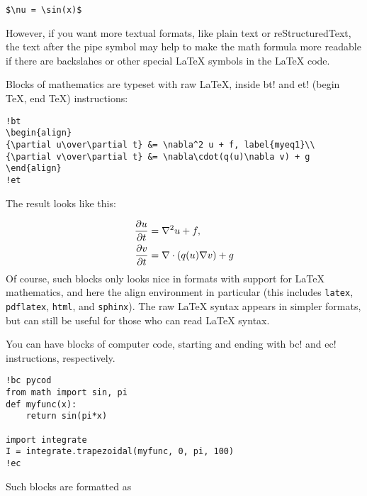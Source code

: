 \documentclass[%
oneside,                 %
final,                   %
10pt]{article}
\begin{document}
\begin{Verbatim}[fontsize=\fontsize{9pt}{9pt},tabsize=8,baselinestretch=0.85,fontfamily=tt,xleftmargin=7mm]
$\nu = \sin(x)$
\end{Verbatim}
\noindent
However, if you want more textual formats, like plain text or reStructuredText,
the text after the pipe symbol may help to make the math formula more readable
if there are backslahes or other special {\LaTeX} symbols in the {\LaTeX} code.

Blocks of mathematics are typeset with raw {\LaTeX}, inside
{\fontsize{10pt}{10pt}\Verb!!bt!} and {\fontsize{10pt}{10pt}\Verb!!et!} (begin TeX, end TeX) instructions:

\begin{Verbatim}[fontsize=\fontsize{9pt}{9pt},tabsize=8,baselinestretch=0.85,fontfamily=tt,xleftmargin=7mm]
!bt
\begin{align}
{\partial u\over\partial t} &= \nabla^2 u + f, label{myeq1}\\ 
{\partial v\over\partial t} &= \nabla\cdot(q(u)\nabla v) + g
\end{align}
!et
\end{Verbatim}
\noindent
The result looks like this:

\begin{align}
{\partial u\over\partial t} &= \nabla^2 u + f, \label{myeq1}\\ 
{\partial v\over\partial t} &= \nabla\cdot(q(u)\nabla v) + g
\end{align}
Of course, such blocks only looks nice in formats with support
for {\LaTeX} mathematics, and here the align environment in particular
(this includes {\fontsize{10pt}{10pt}\Verb!latex!}, {\fontsize{10pt}{10pt}\Verb!pdflatex!}, {\fontsize{10pt}{10pt}\Verb!html!}, and {\fontsize{10pt}{10pt}\Verb!sphinx!}). The raw
{\LaTeX} syntax appears in simpler formats, but can still be useful
for those who can read {\LaTeX} syntax.

You can have blocks of computer code, starting and ending with
{\fontsize{10pt}{10pt}\Verb!!bc!} and {\fontsize{10pt}{10pt}\Verb!!ec!} instructions, respectively.

\begin{Verbatim}[fontsize=\fontsize{9pt}{9pt},tabsize=8,baselinestretch=0.85,fontfamily=tt,xleftmargin=7mm]
!bc pycod
from math import sin, pi
def myfunc(x):
    return sin(pi*x)

import integrate
I = integrate.trapezoidal(myfunc, 0, pi, 100)
!ec
\end{Verbatim}
\noindent
Such blocks are formatted as
\end{document}
